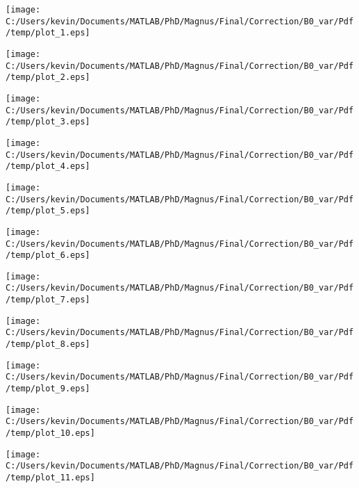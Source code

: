 \begin{landscape}
\texttt{[image: C:/Users/kevin/Documents/MATLAB/PhD/Magnus/Final/Correction/B0\_var/Pdf/temp/plot\_1.eps]}
\end{landscape}
\begin{landscape}
\texttt{[image: C:/Users/kevin/Documents/MATLAB/PhD/Magnus/Final/Correction/B0\_var/Pdf/temp/plot\_2.eps]}
\end{landscape}
\begin{landscape}
\texttt{[image: C:/Users/kevin/Documents/MATLAB/PhD/Magnus/Final/Correction/B0\_var/Pdf/temp/plot\_3.eps]}
\end{landscape}
\begin{landscape}
\texttt{[image: C:/Users/kevin/Documents/MATLAB/PhD/Magnus/Final/Correction/B0\_var/Pdf/temp/plot\_4.eps]}
\end{landscape}
\begin{landscape}
\texttt{[image: C:/Users/kevin/Documents/MATLAB/PhD/Magnus/Final/Correction/B0\_var/Pdf/temp/plot\_5.eps]}
\end{landscape}
\begin{landscape}
\texttt{[image: C:/Users/kevin/Documents/MATLAB/PhD/Magnus/Final/Correction/B0\_var/Pdf/temp/plot\_6.eps]}
\end{landscape}
\begin{landscape}
\texttt{[image: C:/Users/kevin/Documents/MATLAB/PhD/Magnus/Final/Correction/B0\_var/Pdf/temp/plot\_7.eps]}
\end{landscape}
\begin{landscape}
\texttt{[image: C:/Users/kevin/Documents/MATLAB/PhD/Magnus/Final/Correction/B0\_var/Pdf/temp/plot\_8.eps]}
\end{landscape}
\begin{landscape}
\texttt{[image: C:/Users/kevin/Documents/MATLAB/PhD/Magnus/Final/Correction/B0\_var/Pdf/temp/plot\_9.eps]}
\end{landscape}
\begin{landscape}
\texttt{[image: C:/Users/kevin/Documents/MATLAB/PhD/Magnus/Final/Correction/B0\_var/Pdf/temp/plot\_10.eps]}
\end{landscape}
\begin{landscape}
\texttt{[image: C:/Users/kevin/Documents/MATLAB/PhD/Magnus/Final/Correction/B0\_var/Pdf/temp/plot\_11.eps]}
\end{landscape}
